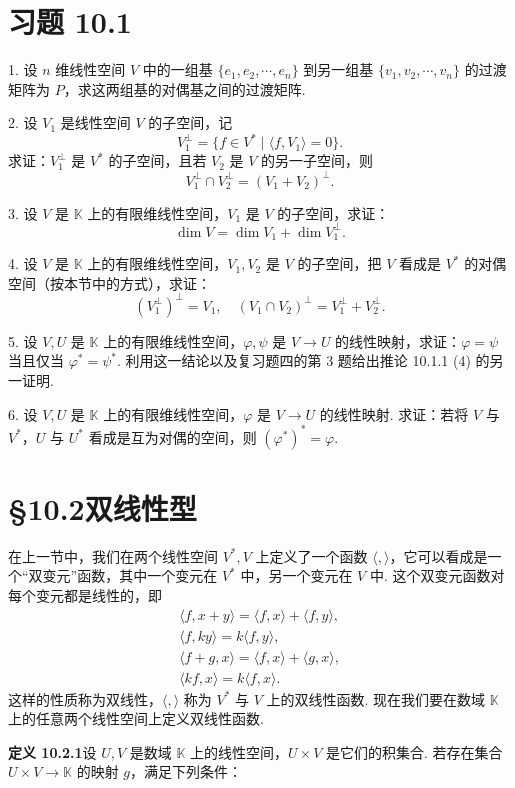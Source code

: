 \documentclass[UTF8, 12pt, fontset=fandol, oneside]{ctexart}
\begin{document}
\section*{习题 10.1}

1. 设 $n$ 维线性空间 $V$ 中的一组基 $\{e_1,e_2,\cdots,e_n\}$ 到另一组基 $\{v_1,v_2,\cdots,v_n\}$ 的过渡矩阵为 $P$，求这两组基的对偶基之间的过渡矩阵.

2. 设 $V_1$ 是线性空间 $V$ 的子空间，记
\[
  V_1^\perp=\{f\in V^*\mid \langle f,V_1\rangle=0\}.
\]
求证：$V_1^\perp$ 是 $V^*$ 的子空间，且若 $V_2$ 是 $V$ 的另一子空间，则
\[
  V_1^\perp\cap V_2^\perp=(V_1+V_2)^\perp.
\]

3. 设 $V$ 是 $\mathbb K$ 上的有限维线性空间，$V_1$ 是 $V$ 的子空间，求证：
\[
  \dim V=\dim V_1+\dim V_1^\perp.
\]

4. 设 $V$ 是 $\mathbb K$ 上的有限维线性空间，$V_1,V_2$ 是 $V$ 的子空间，把 $V$ 看成是 $V^*$ 的对偶空间（按本节中的方式），求证：
\[
  (V_1^\perp)^\perp=V_1,\quad (V_1\cap V_2)^\perp=V_1^\perp+V_2^\perp.
\]

5. 设 $V,U$ 是 $\mathbb K$ 上的有限维线性空间，$\varphi,\psi$ 是 $V\to U$ 的线性映射，求证：$\varphi=\psi$ 当且仅当 $\varphi^*=\psi^*$. 利用这一结论以及复习题四的第 3 题给出推论 10.1.1 (4) 的另一证明.

6. 设 $V,U$ 是 $\mathbb K$ 上的有限维线性空间，$\varphi$ 是 $V\to U$ 的线性映射. 求证：若将 $V$ 与 $V^*$，$U$ 与 $U^*$ 看成是互为对偶的空间，则 $(\varphi^*)^*=\varphi$.

\section*{§10.2\quad 双线性型}

在上一节中，我们在两个线性空间 $V^*,V$ 上定义了一个函数 $\langle,\rangle$，它可以看成是一个``双变元''函数，其中一个变元在 $V^*$ 中，另一个变元在 $V$ 中. 这个双变元函数对每个变元都是线性的，即
\[
\begin{gathered}
  \langle f,x+y\rangle=\langle f,x\rangle+\langle f,y\rangle,\\
  \langle f,ky\rangle=k\langle f,y\rangle,\\
  \langle f+g,x\rangle=\langle f,x\rangle+\langle g,x\rangle,\\
  \langle kf,x\rangle=k\langle f,x\rangle.
\end{gathered}
\]
这样的性质称为双线性，$\langle,\rangle$ 称为 $V^*$ 与 $V$ 上的双线性函数. 现在我们要在数域 $\mathbb K$ 上的任意两个线性空间上定义双线性函数.

\noindent\textbf{定义 10.2.1}\quad 设 $U,V$ 是数域 $\mathbb K$ 上的线性空间，$U\times V$ 是它们的积集合. 若存在集合 $U\times V\to\mathbb K$ 的映射 $g$，满足下列条件：
\end{document}

